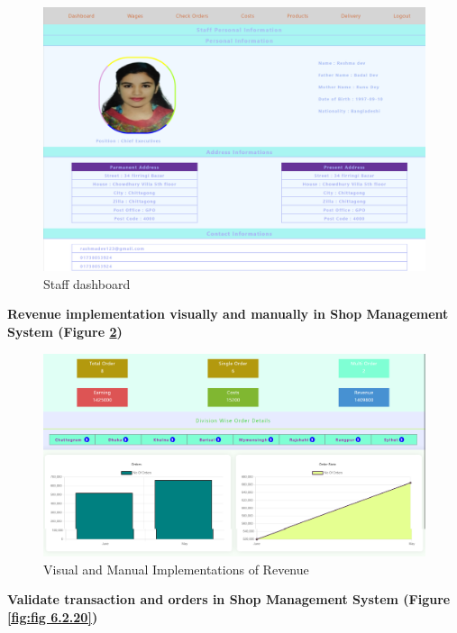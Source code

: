 \begin{figure}[ht]
    \centering  
    \includegraphics[width=\textwidth, height=0.6\textheight, keepaspectratio]{designs/staff's dashboard.png}    
    \caption{Staff dashboard}
    \label{fig:fig 6.2.18}
\end{figure}

\newpage
\textbf{Revenue implementation visually and manually in Shop Management System (Figure \ref{fig:fig 6.2.19})}\\

\begin{figure}[ht]
    \centering  
    \includegraphics[width=\textwidth, height=0.3\textheight, keepaspectratio]{designs/Reveneue and graph.png}    
    \caption{Visual and Manual Implementations of Revenue}
    \label{fig:fig 6.2.19}
\end{figure}

\vspace{2cm}
\textbf{Validate transaction and orders in Shop Management System (Figure \ref{fig:fig 6.2.20})}\\

